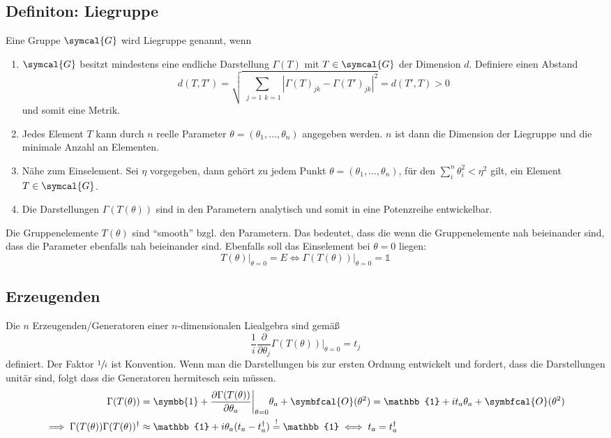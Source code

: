 \documentclass[
  captions=tableheading,  %
  titlepage=firstiscover, %
]{scrartcl}
\begin{document}
\subsection{Definiton: Liegruppe}
Eine Gruppe $\symcal{G}$ wird Liegruppe genannt, wenn
\begin{enumerate}
  \item $\symcal{G}$ besitzt mindestens eine endliche Darstellung $\Gamma(T)$ mit $T \in \symcal{G}$ der Dimension 
  $d$. 
  Definiere einen Abstand 
    \begin{equation*}
      d(T,T') = \sqrt{\sum_{\substack{j=1}{k=1}} \left | \Gamma(T)_{jk} - \Gamma(T')_{jk} \right |^2  } = d(T',T) > 0
    \end{equation*}
    und somit eine Metrik.
  \item Jedes Element $T$ kann durch $n$ reelle Parameter $\theta = (\theta_1, \ldots, \theta_n)$ angegeben werden.
    $n$ ist dann die Dimension der Liegruppe und die minimale Anzahl an Elementen.
  \item Nähe zum Einselement. Sei $\eta$ vorgegeben, dann gehört zu jedem Punkt $\theta =  (\theta_1, \ldots, \theta_n)$,
    für den $\sum_i^n \theta_i^2 < \eta^2$ gilt, ein Element $T \in \symcal{G}$.
  \item Die Darstellungen $\Gamma(T(\theta))$ sind in den Parametern analytisch und somit in eine Potenzreihe entwickelbar.
\end{enumerate}
Die Gruppenelemente $T(\theta)$ sind \enquote{smooth} bzgl. den Parametern. 
Das bedeutet, dass die wenn die Gruppenelemente nah beieinander sind, dass die Parameter ebenfalls nah beieinander sind.
Ebenfalls soll das Einselement bei $\theta = 0$ liegen:
\begin{equation*}
  T(\theta)\big |_{\theta = 0} = E \iff \Gamma(T(\theta)) \big |_{\theta = 0} = \mathbb{1}
\end{equation*}
\subsection{Erzeugenden}
Die $n$ Erzeugenden/Generatoren einer $n$-dimensionalen Liealgebra sind gemäß 
\begin{equation*}
  \frac{1}{i} \frac{\partial}{\partial \theta_j} \Gamma(T(\theta)) \biggr |_{\theta = 0} = t_j \label{eqn:gen}
\end{equation*}
definiert. 
Der Faktor $\sfrac{1}{i}$ ist Konvention.
Wenn man die Darstellungen bis zur ersten Ordnung entwickelt und fordert, dass die Darstellungen 
unitär sind, folgt dass die Generatoren hermitesch sein müssen. 
\begin{align*}
  \Gamma(T(\theta)) &= \symbb{1} + \frac{\partial \Gamma(T(\theta))}{\partial \theta_a} \biggr |_{\theta = 0} \theta_a + \symbfcal{O}(\theta^2) 
  = \mathbb{1} + i t_a \theta_a + \symbfcal{O}(\theta^2) \\
  \implies \Gamma(T(\theta))\Gamma(T(\theta))^{\dagger}  &\approx \mathbb{1} + i \theta_a (t_a - t_a^{\dagger}) \stackrel{!}{=} \mathbb{1} \iff t_a = t_a^{\dagger}
\end{align*}
\end{document}
